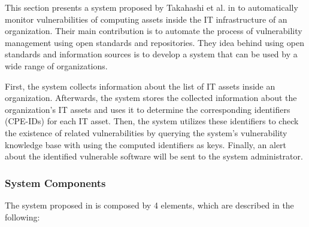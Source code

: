 \documentclass{llncs}
\begin{document}
\par This section presents a system proposed by Takahashi et al. in \cite{paper1} to automatically monitor vulnerabilities of computing assets inside the IT infrastructure of an organization. Their main contribution is to automate the process of vulnerability management using open standards and repositories. They idea behind using open standards and information sources is to develop a system that can be used  by a wide range of organizations.
\par
 First, the system collects information about the list of IT assets inside an organization. Afterwards, the system stores the collected information about the organization's IT assets and uses it to determine the corresponding  identifiers (CPE-IDs) for each IT asset. Then, the system utilizes these identifiers to check the existence of related vulnerabilities by querying the system's vulnerability knowledge base with using the computed identifiers as keys. Finally, an alert about the identified vulnerable software will be sent to the system administrator.
    
\subsubsection {System Components }

\begin{flushleft}
 The system proposed in \cite{paper1} is composed by 4 elements, which are described in the following:
\end{flushleft}
\end{document}
